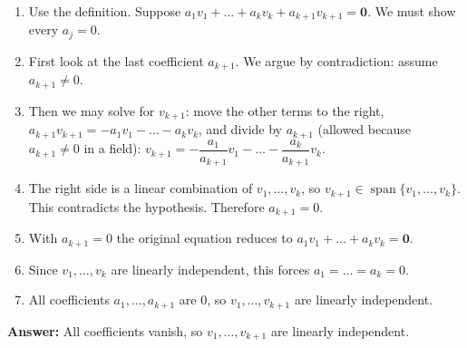 \documentclass[11pt]{article}
\begin{document}
\begin{tcolorbox}[breakable,colback=ans,colframe=ansb,boxrule=0.5pt,left=4pt,right=4pt,top=2pt,bottom=2pt]\begin{enumerate}[leftmargin=2.2em,itemsep=1pt,topsep=1pt,label=\textbf{Step \arabic*.}]\item Use the definition. Suppose $a_1v_1+\dots+a_kv_k+a_{k+1}v_{k+1}=\mathbf 0$. We must show every $a_j=0$.
\item First look at the last coefficient $a_{k+1}$. We argue by contradiction: assume $a_{k+1}\neq0$.
\item Then we may solve for $v_{k+1}$: move the other terms to the right, $a_{k+1}v_{k+1}=-a_1v_1-\dots-a_kv_k$, and divide by $a_{k+1}$ (allowed because $a_{k+1}\neq0$ in a field): $v_{k+1}=-\dfrac{a_1}{a_{k+1}}v_1-\dots-\dfrac{a_k}{a_{k+1}}v_k$.
\item The right side is a linear combination of $v_1,\dots,v_k$, so $v_{k+1}\in\operatorname{span}\{v_1,\dots,v_k\}$. This contradicts the hypothesis. Therefore $a_{k+1}=0$.
\item With $a_{k+1}=0$ the original equation reduces to $a_1v_1+\dots+a_kv_k=\mathbf 0$.
\item Since $v_1,\dots,v_k$ are linearly independent, this forces $a_1=\dots=a_k=0$.
\item All coefficients $a_1,\dots,a_{k+1}$ are $0$, so $v_1,\dots,v_{k+1}$ are linearly independent.
\end{enumerate}\textbf{Answer:} All coefficients vanish, so $v_1,\dots,v_{k+1}$ are linearly independent.\end{tcolorbox}
\par\vspace{2pt}
\end{document}
